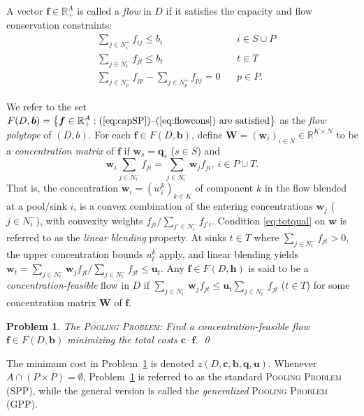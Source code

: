 \documentclass[pdflatex,sn-mathphys-num]{sn-jnl}%
\theoremstyle{thmstyleone}%
\newtheorem{problem}[theorem]{Problem}%
\begin{document}
A vector $\boldsymbol{f}\in\mathbb{R}_+^{A}$ is called a \emph{flow} in $D$ if it satisfies the capacity and flow conservation constraints:
\begin{eqnarray}
           & \sum_{j\in N_i^+}f_{ij}\leq b_i & i\in S\cup P\label{eq:capSP} \\
           & \sum_{j\in N_t^-}f_{jt}\leq b_t & t\in T\label{eq:capT} \\
           & \sum_{j\in N_p^-}f_{jp}-\sum_{j\in N_p^+}f_{pj} = 0~~~~ & p\in P. \label{eq:flowcons}
\end{eqnarray}

\noindent
We refer to the set
$F(D,\boldsymbol{b}) = \left\{\boldsymbol{f}\in\mathbb{R}_+^{A}: \mbox{(\ref{eq:capSP})--(\ref{eq:flowcons}) are satisfied}\right\}$
as the \emph{flow polytope} of $(D,b)$.
For each $\boldsymbol{f}\in F(D,\boldsymbol{b})$,
define $\boldsymbol{W}=\left(\boldsymbol{w}_i\right)_{i\in N}\in\mathbb{R}^{K\times N}$ to be a
\emph{concentration matrix} of $\boldsymbol{f}$ if $\boldsymbol{w}_s=\boldsymbol{q}_s$ ($s\in S$) and
\begin{equation} \label{eq:totqual}
  \boldsymbol{w}_i\sum_{j\in N_i^-}f_{ji}=\sum_{j\in N_i^-}\boldsymbol{w}_jf_{ji},\ i\in P\cup T.
\end{equation}
That is, the concentration $\boldsymbol{w}_i=\left(w_i^k\right)_{k\in K}$ of component $k$ in the flow blended at a pool/sink $i$,
is a convex combination of the entering concentrations $\boldsymbol{w}_j$ ($j\in N_i^-$),
with convexity weights $f_{ji}/\sum_{j'\in N_i^-}f_{j'i}$.
Condition \eqref{eq:totqual} on $\boldsymbol{w}$ is referred to as the \emph{linear blending} property.
At sinks $t\in T$ where $\sum_{j\in N_t^-}f_{jt}>0$, the upper concentration bounds $u_t^k$ apply,
and linear blending yields $\boldsymbol{w}_t=\sum_{j\in N_t^-}\boldsymbol{w}_jf_{jt}/\sum_{j\in N_t^-}f_{jt}\leq \boldsymbol{u}_t$.
Any $\boldsymbol{f}\in F\left(D,\boldsymbol{h}\right)$ is said to be a \emph{concentration-feasible} flow in
$D$ if $\sum_{j\in N_t^-}\boldsymbol{w}_jf_{jt}\leq \boldsymbol{u}_t\sum_{j\in N_t^-}f_{jt}$ ($t\in T$)
for some concentration matrix $\boldsymbol{W}$ of $\boldsymbol{f}$.

\begin{problem} \label{prob:pp}
The \textsc{Pooling Problem}: Find a concentration-feasible flow $\boldsymbol{f}\in F(D,\boldsymbol{b})$
minimizing the total costs $\boldsymbol{c}\cdot\boldsymbol{f}$.
\qed
\end{problem}

The minimum cost in Problem~\ref{prob:pp} is denoted $z(D,\boldsymbol{c},\boldsymbol{b},\boldsymbol{q},\boldsymbol{u})$.
Whenever $A\cap(P\times P)=\emptyset$, Problem~\ref{prob:pp} is referred to as the standard \textsc{Pooling Problem} (SPP),
while the general version is called the \emph{generalized} \textsc{Pooling Problem} (GPP).
\end{document}
